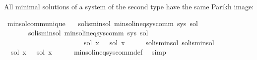 \begin{isabellebody}
\endisatagproof
{\isafoldproof}%
%
\isadelimproof
%
\endisadelimproof
%
\begin{isamarkuptext}%
All minimal solutions of a system of the second type have the same Parikh image:%
\end{isamarkuptext}\isamarkuptrue%
\isamarkupfalse%
\ min{\isacharunderscore}{\kern0pt}sol{\isacharunderscore}{\kern0pt}comm{\isacharunderscore}{\kern0pt}unique{\isacharcolon}{\kern0pt}\isanewline
\ \ \ sol{}{\isacharunderscore}{\kern0pt}is{\isacharunderscore}{\kern0pt}min{\isacharunderscore}{\kern0pt}sol{\isacharcolon}{\kern0pt}\ {\isachardoublequoteopen}min{\isacharunderscore}{\kern0pt}sol{\isacharunderscore}{\kern0pt}ineq{\isacharunderscore}{\kern0pt}sys{\isacharunderscore}{\kern0pt}comm\ sys\ sol{}{\isachardoublequoteclose}\isanewline
\ \ \ \ \ \ \ sol{}{\isacharunderscore}{\kern0pt}is{\isacharunderscore}{\kern0pt}min{\isacharunderscore}{\kern0pt}sol{\isacharcolon}{\kern0pt}\ {\isachardoublequoteopen}min{\isacharunderscore}{\kern0pt}sol{\isacharunderscore}{\kern0pt}ineq{\isacharunderscore}{\kern0pt}sys{\isacharunderscore}{\kern0pt}comm\ sys\ sol{}{\isachardoublequoteclose}\isanewline
\ \ \ \ \ \ \ \ \ \ \ \ \ \ \ \ \ \ \ \ \ \ {\isachardoublequoteopen}{\isasymPsi}\ {\isacharparenleft}{\kern0pt}sol{}\ x{\isacharparenright}{\kern0pt}\ {\isacharequal}{\kern0pt}\ {\isasymPsi}\ {\isacharparenleft}{\kern0pt}sol{}\ x{\isacharparenright}{\kern0pt}{\isachardoublequoteclose}\isanewline
%
\isadelimproof
%
\endisadelimproof
%
\isatagproof
{}\isamarkupfalse%
\ {\isacharminus}{\kern0pt}\isanewline
\ \ \isamarkupfalse%
\ sol{}{\isacharunderscore}{\kern0pt}is{\isacharunderscore}{\kern0pt}min{\isacharunderscore}{\kern0pt}sol\ sol{}{\isacharunderscore}{\kern0pt}is{\isacharunderscore}{\kern0pt}min{\isacharunderscore}{\kern0pt}sol\ \isamarkupfalse%
\ {\isachardoublequoteopen}{\isasymPsi}\ {\isacharparenleft}{\kern0pt}sol{}\ x{\isacharparenright}{\kern0pt}\ {\isasymsubseteq}\ {\isasymPsi}\ {\isacharparenleft}{\kern0pt}sol{}\ x{\isacharparenright}{\kern0pt}{\isachardoublequoteclose}\isanewline
\ \ \ \ \isamarkupfalse%
\ min{\isacharunderscore}{\kern0pt}sol{\isacharunderscore}{\kern0pt}ineq{\isacharunderscore}{\kern0pt}sys{\isacharunderscore}{\kern0pt}comm{\isacharunderscore}{\kern0pt}def\ \isamarkupfalse%
\ simp\isanewline

\end{isabellebody}
